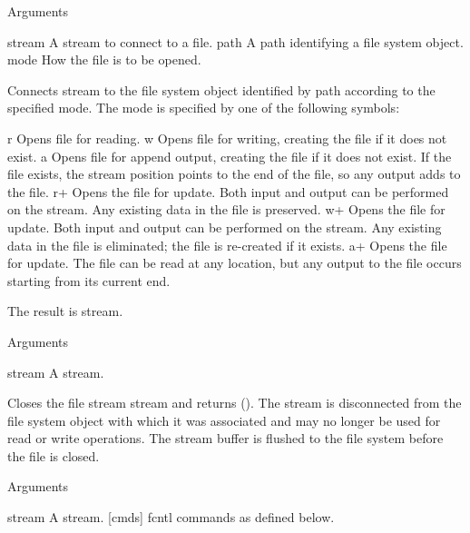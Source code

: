 \begin{optPrivate}
%


Arguments

stream
A stream to connect to a file.
path
A path identifying a file system object.
mode
How the file is to be opened.

Connects stream to the file system object identified by path according to the
specified mode. The mode is specified by one of the following symbols:

r
Opens file for reading.
w
Opens file for writing, creating the file if it does not exist.
a
Opens file for append output, creating the file if it does not exist. If
the file exists, the stream position points to the end of the file, so any
output adds to the file.
r+
Opens the file for update. Both input and output can be performed on the
stream. Any existing data in the file is preserved.
w+
Opens the file for update. Both input and output can be performed on the
stream. Any existing data in the file is eliminated; the file is re-created
if it exists.
a+
Opens the file for update. The file can be read at any location, but any
output to the file occurs starting from its current end.

The result is stream.


Arguments

stream
A stream.

Closes the file stream stream and returns (). The stream is disconnected from
the file system object with which it was associated and may no longer be used
for read or write operations. The stream buffer is flushed to the file system
before the file is closed.


Arguments

stream
A stream.
[cmds]
fcntl commands as defined below.


\end{optPrivate}
